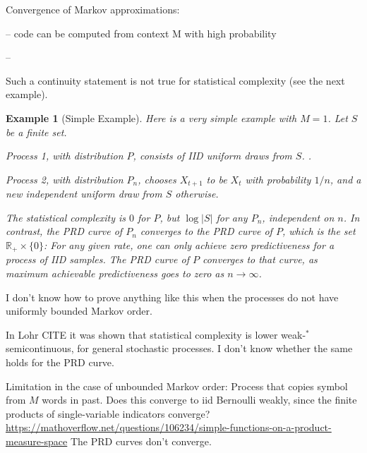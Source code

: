 \documentclass[11pt,letterpaper]{article}
\newcounter{theorem}
\newtheorem{example}[theorem]{Example}
\begin{document}
Convergence of Markov approximations:

-- code can be computed from context M with high probability

-- 


	


Such a continuity statement is not true for statistical complexity (see the next example).

\begin{example}[Simple Example]
Here is a very simple example with $M=1$.
Let $S$ be a finite set.

Process 1, with distribution $P$, consists of IID uniform draws from $S$. . %

Process 2, with distribution $P_n$, chooses $X_{t+1}$ to be $X_t$ with probability $1/n$, and a new independent uniform draw from $S$ otherwise. 

The statistical complexity is $0$ for $P$, but $\log |S|$ for any $P_n$, independent on $n$. In contrast, the PRD curve of $P_n$ converges to the PRD curve of $P$, which is the set $\mathbb{R}_+ \times \{0\}$: For any given rate, one can only achieve zero predictiveness for a process of IID samples.
The PRD curve of $P$ converges to that curve, as maximum achievable predictiveness goes to zero as $n\rightarrow \infty$.
\end{example}

I don't know how to prove anything like this when the processes do not have uniformly bounded Markov order.

In Lohr CITE it was shown that statistical complexity is lower weak-$^*$ semicontinuous, for general stochastic processes.
I don't know whether the same holds for the PRD curve.


Limitation in the case of unbounded Markov order: Process that copies symbol from $M$ words in past. Does this converge to iid Bernoulli weakly, since the finite products of single-variable indicators converge?
\url{https://mathoverflow.net/questions/106234/simple-functions-on-a-product-measure-space}
The PRD curves don't converge.
\end{document}
